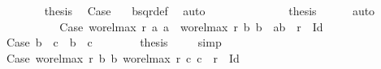 \begin{isabellebody}
\ \ \ \ \ \ \isamarkupfalse%
\ {\isacharquery}{\kern0pt}thesis\ \isamarkupfalse%
\ Case{}\ {}\ \isamarkupfalse%
\ bsqr{\isacharunderscore}{\kern0pt}def\ \isamarkupfalse%
\ auto\isanewline
\ \ \ \ \ \isacommand{{\isacharbraceright}{\kern0pt}}\isamarkupfalse%
\isanewline
\ \ \ \ \ \isamarkupfalse%
\ \isamarkupfalse%
\ {\isacharquery}{\kern0pt}thesis\ \isamarkupfalse%
\ {}\ {}\ \isamarkupfalse%
\ auto\isanewline
\ \ \ \ \isacommand{{\isacharbraceright}{\kern0pt}}\isamarkupfalse%
\isanewline
\ \ \ \ \isamarkupfalse%
\isanewline
\ \ \ \ \isacommand{{\isacharbraceleft}{\kern0pt}}\isamarkupfalse%
\isamarkupfalse%
\ Case{}{\isacharcolon}{\kern0pt}\ {\isachardoublequoteopen}wo{\isacharunderscore}{\kern0pt}rel{\isachardot}{\kern0pt}max{}\ r\ a{}\ a{}\ {\isacharequal}{\kern0pt}\ wo{\isacharunderscore}{\kern0pt}rel{\isachardot}{\kern0pt}max{}\ r\ b{}\ b{}\ {\isasymand}\ {\isacharparenleft}{\kern0pt}a{}{\isacharcomma}{\kern0pt}b{}{\isacharparenright}{\kern0pt}\ {\isasymin}\ r\ {\isacharminus}{\kern0pt}\ Id{\isachardoublequoteclose}\isanewline
\ \ \ \ \ \isacommand{{\isacharbraceleft}{\kern0pt}}\isamarkupfalse%
\isamarkupfalse%
\ Case{}{}{\isacharcolon}{\kern0pt}\ {\isachardoublequoteopen}b{}\ {\isacharequal}{\kern0pt}\ c{}\ {\isasymand}\ b{}\ {\isacharequal}{\kern0pt}\ c{}{\isachardoublequoteclose}\isanewline
\ \ \ \ \ \ \isamarkupfalse%
\ {\isacharquery}{\kern0pt}thesis\ \isamarkupfalse%
\ {\isacharasterisk}{\kern0pt}\ \isamarkupfalse%
\ simp\isanewline
\ \ \ \ \ \isacommand{{\isacharbraceright}{\kern0pt}}\isamarkupfalse%
\isanewline
\ \ \ \ \ \isamarkupfalse%
\isanewline
\ \ \ \ \ \isacommand{{\isacharbraceleft}{\kern0pt}}\isamarkupfalse%
\isamarkupfalse%
\ Case{}{}{\isacharcolon}{\kern0pt}\ {\isachardoublequoteopen}{\isacharparenleft}{\kern0pt}wo{\isacharunderscore}{\kern0pt}rel{\isachardot}{\kern0pt}max{}\ r\ b{}\ b{}{\isacharcomma}{\kern0pt}\ wo{\isacharunderscore}{\kern0pt}rel{\isachardot}{\kern0pt}max{}\ r\ c{}\ c{}{\isacharparenright}{\kern0pt}\ {\isasymin}\ r\ {\isacharminus}{\kern0pt}\ Id{\isachardoublequoteclose}\isanewline

\end{isabellebody}
